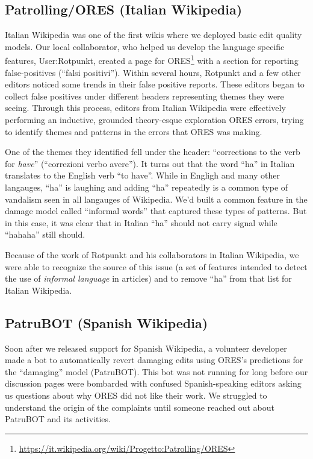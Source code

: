\subsection{Patrolling/ORES (Italian Wikipedia)}
Italian Wikipedia was one of the first wikis where we deployed basic edit quality models.  Our local collaborator, who helped us develop the language specific features, User:Rotpunkt, created a page for ORES\footnote{\url{https://it.wikipedia.org/wiki/Progetto:Patrolling/ORES}} with a section for reporting false-positives (``falsi positivi'').  Within several hours, Rotpunkt and a few other editors noticed some trends in their false positive reports.  These editors began to collect false positives under different headers representing themes they were seeing.  Through this process, editors from Italian Wikipedia were effectively performing an inductive, grounded theory-esque exploration ORES errors, trying to identify themes and patterns in the errors that ORES was making.

One of the themes they identified fell under the header: ``corrections to the verb for \emph{have}'' (``correzioni verbo avere'').  It turns out that the word ``ha'' in Italian translates to the English verb ``to have''.  While in Engligh and many other langauges, ``ha'' is laughing and adding ``ha'' repeatedly is a common type of vandalism seen in all langauges of Wikipedia.  We'd built a common feature in the damage model called ``informal words'' that captured these types of patterns.  But in this case, it was clear that in Italian ``ha'' should not carry signal while ``hahaha'' still should.

Because of the work of Rotpunkt and his collaborators in Italian Wikipedia, we were able to recognize the source of this issue (a set of features intended to detect the use of \emph{informal language} in articles) and to remove ``ha'' from that list for Italian Wikipedia.

\subsection{PatruBOT (Spanish Wikipedia)}
Soon after we released support for Spanish Wikipedia, a volunteer developer made a bot to automatically revert damaging edits using ORES's predictions for the ``damaging'' model (PatruBOT).  This bot was not running for long before our discussion pages were bombarded with confused Spanish-speaking editors asking us questions about why ORES did not like their work.  We struggled to understand the origin of the complaints until someone reached out about PatruBOT and its activities.

